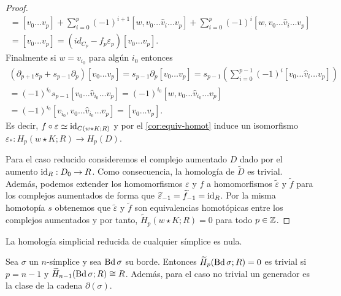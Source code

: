 \begin{proof}
\begin{gather*}
	=[v_{0}\dots v_{p}]+\sum_{i=0}^{p}(-1)^{i+1}[w,v_{0}\dots\hat{v}_{i}\dots v_{p}]+\sum_{i=0}^{p}(-1)^{i}[w,v_{0}\dots\hat{v}_{i}\dots v_p] \\
	=[v_{0}\dots v_{p}]=(id_{C_{p}}-f_{p}\varepsilon_{p})[v_{0}\dots v_{p}].
	\end{gather*}
	Finalmente si $w = v_{i_0}$ para algún $i_0$ entonces
	\begin{gather*}
		(\partial_{p+1}s_{p}+s_{p-1}\partial_{p})[v _{0}\dots v _{p}]=s_{p-1}\partial_{p}[v _{0}\dots v _{p}] =s_{p-1} \left( \sum_{i=0}^{p-1} (-1)^i [v _0\dots \hat{v}_i \dots v _{p}] \right) \\
		=(-1)^{i_0} s_{p-1}[v _0\dots \hat{v}_{i_0} \dots v _p] =(-1)^{i_0} [w,v _0\dots \hat{v}_{i_0} \dots v _p] \\ =(-1)^{i_0} [v_{i_0},v _0\dots \hat{v}_{i_0} \dots v _p]
		=[v _0\dots v _p].
	\end{gather*}
	Es decir, $f \circ \varepsilon \simeq \operatorname{id}_{C(w \star K;R)}$ y por el \autoref{cor:equiv-homot} induce un isomorfismo $\varepsilon_*: H_p(w \star K;R) \to H_p(D)$.
	
	Para el caso reducido consideremos el complejo aumentado $D$ dado por el aumento $\operatorname{id}_R : D_0 \to R$. Como consecuencia, la homología de $\widetilde{D}$ es trivial. Además, podemos extender los homomorfismos $\varepsilon$ y $f$ a homomorfismos $\widetilde{\varepsilon}$ y $\widetilde{f}$ para los complejos aumentados de forma que $\widetilde{\varepsilon}_{-1} = \widetilde{f}_{-1} = \operatorname{id}_R$. Por la misma homotopía $s$ obtenemos que $\widetilde{\varepsilon}$ y $\widetilde{f}$ son equivalencias homotópicas entre los complejos aumentados y por tanto, $\widetilde{H}_p(w \star K;R) = 0$ para todo $p \in \mathbb{Z}$.
\end{proof}
\begin{corolario}
	\label{cor:cono-nulo}
	La homología simplicial reducida de cualquier símplice es nula.
\end{corolario}
\begin{corolario}
	Sea $\sigma$ un $n$-símplice y sea $\operatorname{Bd} \sigma$ su borde. Entonces $\widetilde{H}_p(\operatorname{Bd} \sigma;R) = 0$ es trivial si $p = n-1$ y $\widetilde{H}_{n-1}(\operatorname{Bd} \sigma; R) \cong R$. Además, para el caso no trivial un generador es la clase de la cadena $\partial(\sigma)$.
\end{corolario}
